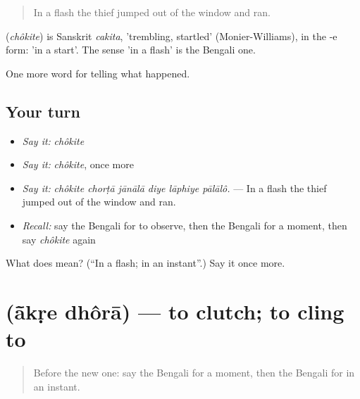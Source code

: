 \begin{quote}
In a flash the thief jumped out of the window and ran.
\end{quote}

\begin{cousinweb}
\textbf{} (\emph{chôkite}) is Sanskrit \emph{cakita}, 'trembling, startled' (Monier-Williams), in the -e form: 'in a start'. The sense 'in a flash' is the Bengali one.
\end{cousinweb}

\begin{grammarlens}[title={What you've built}]
One more word for telling what happened.
\end{grammarlens}

\subsection*{Your turn}
\begin{itemize}
\raggedright
  \item \emph{Say it:} \emph{chôkite}
  \item \emph{Say it:} \emph{chôkite}, once more
  \item \emph{Say it:} \emph{chôkite chorṭā jānālā diye lāphiye pālālô.} — In a flash the thief jumped out of the window and ran.
  \item \emph{Recall:} say the Bengali for to observe, then the Bengali for a moment, then say \emph{chôkite} again
\end{itemize}

\begin{tcolorbox}[breakable,colback=teal!4,colframe=teal!35!black,title={Before you move on}]
What does  mean? (\textquotedblleft{}In a flash; in an instant\textquotedblright{}.) Say it once more.
\end{tcolorbox}
\section[\texorpdfstring{\bn{আঁকড়ে} \bn{ধরা} (ā̃kṛe dhôrā)}{আঁকড়ে ধরা (ā̃kṛe dhôrā)}]{  (ā̃kṛe dhôrā) — to clutch; to cling to}

\label{lesson:BN-C287-akre-dhora}



\begin{quote}
Before the new one: say the Bengali for a moment, then the Bengali for in an instant.
\end{quote}

